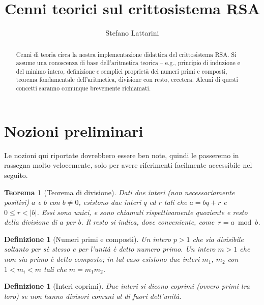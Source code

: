 \documentclass[pdflatex,11pt,a4paper,oneside]{article}
\newcommand{\theauthor}[0]{Stefano Lattarini}
\newcommand{\thetitle}[0]{Cenni teorici sul crittosistema RSA}
\newcommand{\TFA}{teorema fondamentale dell'aritmetica}
\let\OldEmph\emph
\renewcommand{\emph}[1]{\OldEmph{#1\/}}
\newcommand{\abs}[1]{\left|{#1}\right|}
\newcommand{\mmodop}[0]{\ensuremath{\operatorname{mod}}}
\newcommand{\rem}[2]{\ensuremath{{#1}\:\mmodop\:{#2}}}
\newtheorem{theorem}[TheoremLike]{Teorema}
\newtheorem{definition}[TheoremLike]{Definizione}
\begin{document}
\title{\thetitle}
\author{\theauthor}

\maketitle


\begin{abstract}
  Cenni di teoria circa la nostra implementazione didattica del
  crittosistema RSA.  Si assume una conoscenza di base dell'aritmetica
  teorica -- e.g., principio di induzione e del minimo intero, definizione
  e semplici propriet\`a dei numeri primi e composti, \TFA, divisione con
  resto, eccetera.  Alcuni di questi concetti saranno comunque brevemente
  richiamati.
\end{abstract}


\section{Nozioni preliminari}

Le nozioni qui riportate dovrebbero essere ben note, quindi le
passeremo in rassegna molto velocemente, solo per avere riferimenti
facilmente accessibile nel seguito.

\begin{theorem}[Teorema di divisione]
Dati due interi (non necessariamente positivi) $a$ e $b$ con $b \neq 0$,
esistono due interi $q$ ed $r$ tali che $a = bq + r$ e $0 \leq r
< \abs{b}$. Essi sono unici, e sono chiamati rispettivamente
\emph{quoziente} e \emph{resto} della divisione di $a$ per $b$.
Il resto si indica, dove conveniente, come \,$r = \rem{a}{b}$.
\end{theorem}

\begin{definition}[Numeri primi e composti]
Un intero $p > 1$ che sia divisibile soltanto per s\`e stesso e per
l'unit\`a \`e detto \emph{numero primo}.  Un intero $m > 1$ che non
sia primo \`e detto \emph{composto}; in tal caso esistono due interi
$m_1$, $m_2$ con $1 < m_i < m$ tali che $m = m_1 m_2$.
\end{definition}

\begin{definition}[Interi coprimi]
Due interi si dicono \emph{coprimi} (ovvero \emph{primi tra loro}) se
non hanno divisori comuni al di fuori dell'unit\`a.
\end{definition}
\end{document}
